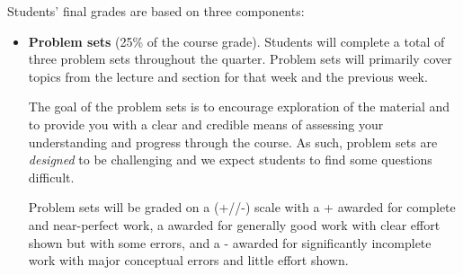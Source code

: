 \documentclass[11pt, article, oneside]{memoir}
\theoremstyle{Assumption}
\begin{document}
Students’ final grades are based on three components:
\begin{itemize}
\item \textbf{Problem sets} (25\% of the course grade). Students will complete a total of three problem sets throughout the quarter. Problem sets will primarily cover topics from the lecture and section for that week and the previous week.

The goal of the problem sets is to encourage exploration of the material and to provide you with a clear and credible means of assessing your understanding and progress through the course. As such, problem sets are \textit{designed} to be challenging and we expect students to find some questions difficult.

Problem sets will be graded on a (+/\checkmark/-) scale with a + awarded for complete and near-perfect work, a \checkmark awarded for generally good work with clear effort shown but with some errors, and a - awarded for significantly incomplete work with major conceptual errors and little effort shown. 
 

\end{itemize}
\end{document}
